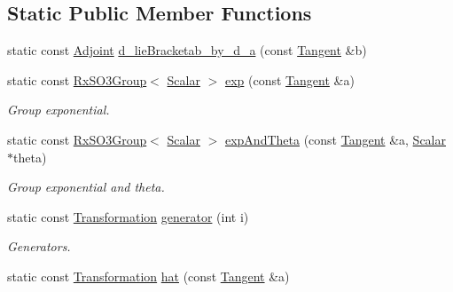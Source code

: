 \subsection*{Static Public Member Functions}
\begin{DoxyCompactItemize}
\item 
static const \hyperlink{class_sophus_1_1_rx_s_o3_group_base_a3f7cc9982043bf0082b7946f566a8179}{Adjoint} \hyperlink{class_sophus_1_1_rx_s_o3_group_base_a37ab5a127ff1e1520f9a5c2482ecb6ab}{d\+\_\+lie\+Bracketab\+\_\+by\+\_\+d\+\_\+a} (const \hyperlink{class_sophus_1_1_rx_s_o3_group_base_aa1c4034b0a69496b28f1e81fdc7510c5}{Tangent} \&b)
\item 
static const \hyperlink{class_sophus_1_1_rx_s_o3_group}{Rx\+S\+O3\+Group}$<$ \hyperlink{class_sophus_1_1_rx_s_o3_group_base_af4006e7d95216a7e50823a1cd9c9e265}{Scalar} $>$ \hyperlink{class_sophus_1_1_rx_s_o3_group_base_a74aa48955af3292059cdff7bec54480a}{exp} (const \hyperlink{class_sophus_1_1_rx_s_o3_group_base_aa1c4034b0a69496b28f1e81fdc7510c5}{Tangent} \&a)
\begin{DoxyCompactList}\small\item\em Group exponential. \end{DoxyCompactList}\item 
static const \hyperlink{class_sophus_1_1_rx_s_o3_group}{Rx\+S\+O3\+Group}$<$ \hyperlink{class_sophus_1_1_rx_s_o3_group_base_af4006e7d95216a7e50823a1cd9c9e265}{Scalar} $>$ \hyperlink{class_sophus_1_1_rx_s_o3_group_base_a64b2d932b458b49e01ffef1dfb789321}{exp\+And\+Theta} (const \hyperlink{class_sophus_1_1_rx_s_o3_group_base_aa1c4034b0a69496b28f1e81fdc7510c5}{Tangent} \&a, \hyperlink{class_sophus_1_1_rx_s_o3_group_base_af4006e7d95216a7e50823a1cd9c9e265}{Scalar} $\ast$theta)
\begin{DoxyCompactList}\small\item\em Group exponential and theta. \end{DoxyCompactList}\item 
static const \hyperlink{class_sophus_1_1_rx_s_o3_group_base_a60b2d8cd20692d3d39e5e7c729d95145}{Transformation} \hyperlink{class_sophus_1_1_rx_s_o3_group_base_ac6201edf006ea3b099317b6571a885fb}{generator} (int i)
\begin{DoxyCompactList}\small\item\em Generators. \end{DoxyCompactList}\item 
static const \hyperlink{class_sophus_1_1_rx_s_o3_group_base_a60b2d8cd20692d3d39e5e7c729d95145}{Transformation} \hyperlink{class_sophus_1_1_rx_s_o3_group_base_a0158a3e783122fa4ee7833db12f09ffd}{hat} (const \hyperlink{class_sophus_1_1_rx_s_o3_group_base_aa1c4034b0a69496b28f1e81fdc7510c5}{Tangent} \&a)

\end{DoxyCompactItemize}
